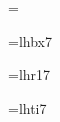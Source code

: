 

\Russian





\magnification= %





\baselineskip=0.6cm
























 \font\sevenbf=lhbx7


 \font\twel=lhr17


 \font\sevenit=lhti7




\def\ss{\textstyle}


\def\kk{\kappa}


\def\tr{\,,\,\ldots\,,\,}


\def\rv{\right\vert\,}


\def\rrv{\right\vert}


\def\lv{\,\left\vert}


\def\rk{\,\right]}


\def\lk{\left[\,}


\def\rf{\right\}}


\def\lf{\left\{}


\def\prl{\,\parallel}


\def\prr{\parallel\,}


\def\paar{\parallel}


\def\sbs{\subset}


\def\sps{\supset}


\def\eps{\varepsilon}


\def\si{\sigma}


